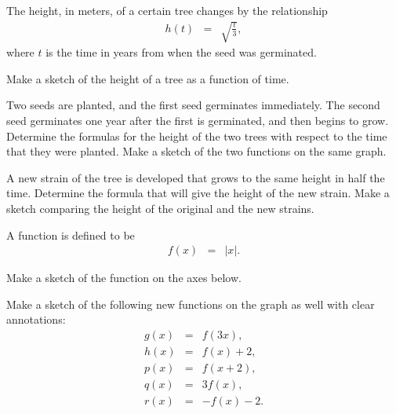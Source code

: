 \begin{problem}
\item The height, in meters, of a certain tree changes by the
  relationship
  \begin{eqnarray*}
    h(t) & = & \sqrt{\frac{t}{3}},
  \end{eqnarray*}
  where $t$ is the time in years from when the seed was germinated.
  \begin{subproblem}
  \item Make a sketch of the height of a tree as a function of time.
    \vfill
  \item Two seeds are planted, and the first seed germinates
    immediately. The second seed germinates one year after the first
    is germinated, and then begins to grow. Determine the formulas for
    the height of the two trees with respect to the time that they
    were planted. Make a sketch of the two functions on
    the same graph.
    \vfill

  \item A new strain of the tree is developed that grows to the same height
    in half the time. Determine the formula that will
    give the height of the new strain. Make a sketch comparing the
    height of the original and the new strains.
    \vfill
  \end{subproblem}

  \clearpage

\item A function is defined to be
  \begin{eqnarray*}
    f(x) & = & |x|.
  \end{eqnarray*}
  \begin{subproblem}
  \item Make a sketch of the function on the axes below.
  \item Make a sketch of the following new functions on the graph as
    well with clear annotations:
    \begin{eqnarray*}
      g(x) & = & f(3x), \\
      h(x) & = & f(x)+2, \\
      p(x) & = & f(x+2), \\
      q(x) & = & 3f(x), \\
      r(x) & = & -f(x)-2.
    \end{eqnarray*}


\end{subproblem}
\end{problem}
